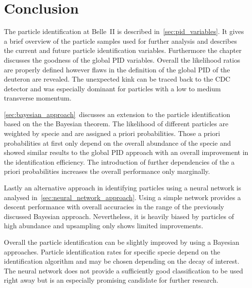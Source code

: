 \chapter{Conclusion}
\label{chap:conclusion}

The particle identification at Belle~\RN{2} is described in~\autoref{sec:pid_variables}. It gives a brief overview of the particle samples used for further analysis and describes the current and future particle identification variables. Furthermore the chapter discusses the goodness of the global PID variables. Overall the likelihood ratios are properly defined however flaws in the definition of the global PID of the deuteron are revealed. The unexpected kink can be traced back to the CDC detector and was especially dominant for particles with a low to medium transverse momentum.

\autoref{sec:bayesian_approach}~discusses an extension to the particle identification based on the the Bayesian theorem. The likelihood of different particles are weighted by specie and are assigned a priori probabilities. Those a priori probabilities at first only depend on the overall abundance of the specie and showed similar results to the global PID approach with an overall improvement in the identification efficiency. The introduction of further dependencies of the a priori probabilities increases the overall performance only marginally.

Lastly an alternative approach in identifying particles using a neural network is analysed in~\autoref{sec:neural_network_approach}. Using a simple network provides a descent performance with overall accuracies in the range of the previously discussed Bayesian approach. Nevertheless, it is heavily biased by particles of high abundance and upsampling only shows limited improvements.

Overall the particle identification can be slightly improved by using a Bayesian approaches. Particle identification rates for specific specie depend on the identification algorithm and may be chosen depending on the decay of interest. The neural network does not provide a sufficiently good classification to be used right away but is an especially promising candidate for further research.
